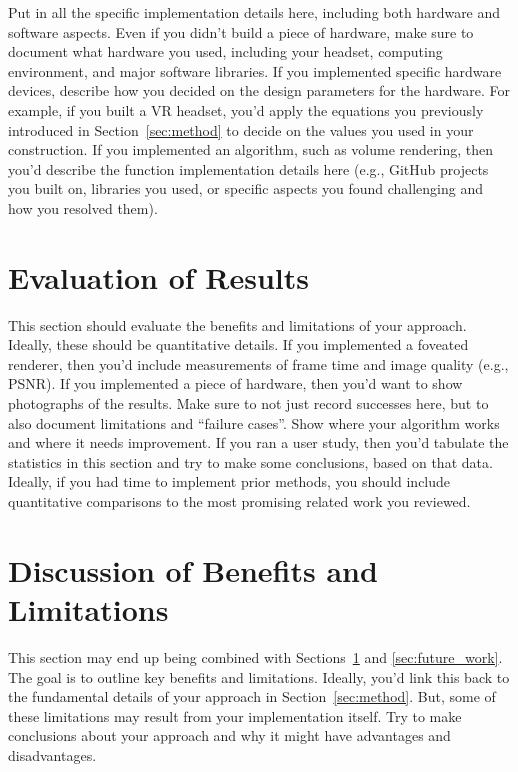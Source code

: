 \documentclass[acmtog,nonacm]{acmart}
\begin{document}
Put in all the specific implementation details here, including both hardware and software aspects. Even if you didn't build a piece of hardware, make sure to document what hardware you used, including your headset, computing environment, and major software libraries. If you implemented specific hardware devices, describe how you decided on the design parameters for the hardware. For example, if you built a VR headset, you'd apply the equations you previously introduced in Section~\ref{sec:method} to decide on the values you used in your construction. If you implemented an algorithm, such as volume rendering, then you'd describe the function implementation details here (e.g., GitHub projects you built on, libraries you used, or specific aspects you found challenging and how you resolved them).

\section{Evaluation of Results}
\label{sec:evaluation}

This section should evaluate the benefits and limitations of your approach. Ideally, these should be quantitative details. If you implemented a foveated renderer, then you'd include measurements of frame time and image quality (e.g., PSNR). If you implemented a piece of hardware, then you'd want to show photographs of the results. Make sure to not just record successes here, but to also document limitations and ``failure cases''. Show where your algorithm works and where it needs improvement. If you ran a user study, then you'd tabulate the statistics in this section and try to make some conclusions, based on that data. Ideally, if you had time to implement prior methods, you should include quantitative comparisons to the most promising related work you reviewed.

\section{Discussion of Benefits and Limitations}

This section may end up being combined with Sections~\ref{sec:evaluation} and \ref{sec:future_work}. The goal is to outline key benefits and limitations. Ideally, you'd link this back to the fundamental details of your approach in Section~\ref{sec:method}. But, some of these limitations may result from your implementation itself. Try to make conclusions about your approach and why it might have advantages and disadvantages.
\end{document}
